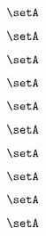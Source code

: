 \begin{forslides}
\begin{comment}
    \begin{equation}
        \label{eq:slides-translation-28}
        \sgrpA = \tup{\HomSet{\sgrpA}{\styleobj{\bullet}}{\styleobj{\bullet}}, \mtimes_\sgrpA}
    \end{equation}

    \begin{equation}
        \label{eq:slides-translation-29}
        \setA
    \end{equation}

    \end{comment}
    \begin{equation}
        \label{eq:slides-translation-30}
        \setA
    \end{equation}

    \begin{equation}
        \label{eq:slides-translation-31}
        \setA
    \end{equation}

    \begin{equation}
        \label{eq:slides-translation-32}
        \setA
    \end{equation}

    \begin{equation}
        \label{eq:slides-translation-33}
        \setA
    \end{equation}

    \begin{equation}
        \label{eq:slides-translation-34}
        \setA
    \end{equation}

    \begin{equation}
        \label{eq:slides-translation-35}
        \setA
    \end{equation}

    \begin{equation}
        \label{eq:slides-translation-36}
        \setA
    \end{equation}

    \begin{equation}
        \label{eq:slides-translation-37}
        \setA
    \end{equation}

    \begin{equation}
        \label{eq:slides-translation-38}
        \setA
    \end{equation}

    \begin{equation}
        \label{eq:slides-translation-39}
        \setA
    \end{equation}


\end{forslides}
